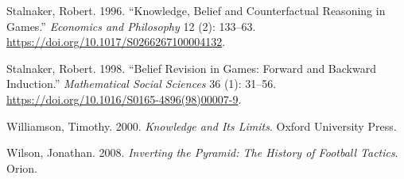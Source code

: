 \documentclass[
  11pt,
  letterpaper,
]{scrbook}
\newlength{\cslhangindent}
\newenvironment{CSLReferences}[2] %
 {\begin{list}{}{%
  \setlength{\itemindent}{0pt}
  \setlength{\leftmargin}{0pt}
  \setlength{\parsep}{0pt}
  \ifodd #1
   \setlength{\leftmargin}{\cslhangindent}
   \setlength{\itemindent}{-1\cslhangindent}
  \fi
  \setlength{\itemsep}{#2\baselineskip}}}
 {\end{list}}
\begin{document}
\begin{CSLReferences}{1}{1}
Stalnaker, Robert. 1996. {``Knowledge, Belief and Counterfactual
Reasoning in Games.''} \emph{Economics and Philosophy} 12 (2): 133--63.
\url{https://doi.org/10.1017/S0266267100004132}.

Stalnaker, Robert. 1998. {``Belief Revision in Games: Forward and
Backward Induction.''} \emph{Mathematical Social Sciences} 36 (1):
31--56. \url{https://doi.org/10.1016/S0165-4896(98)00007-9}.

Williamson, Timothy. 2000. \emph{Knowledge and Its Limits}. {Oxford
University Press}.

Wilson, Jonathan. 2008. \emph{Inverting the Pyramid: The History of
Football Tactics}. Orion.

\end{CSLReferences}


\backmatter
\end{document}
